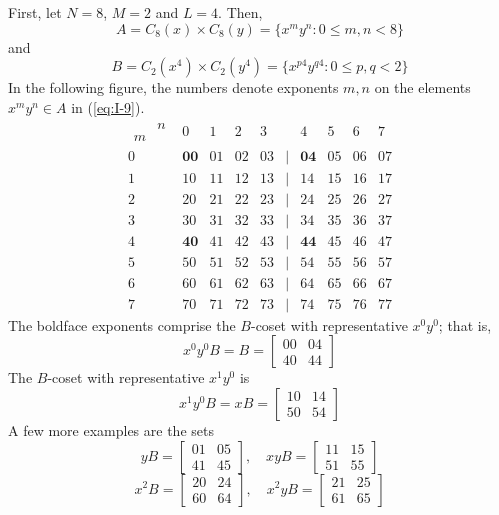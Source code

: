 \begin{example}
First, let $N=8$, $M=2$ and $L=4$.  Then,
\begin{equation}\label{eq:I-9}
A = C_8(x) \times C_8(y) = \{x^m y^n : 0 \leq m,n < 8 \}
\end{equation}
and
\[
B = C_2(x^4) \times C_2(y^4) = \{x^{p4} y^{q4} : 0 \leq p,q < 2 \}
\]
In the following figure, the numbers denote exponents $m,n$ on the
elements $x^my^n \in A$ in (\ref{eq:I-9}). 
\[
\begin{matrix}  
\begin{array}{cc} & n\\
                m & \end{array} & 0 & 1 & 2 & 3 &  & 4 & 5 & 6 & 7\\
0 & \mathbf{00} & 01 & 02 & 03 & | & \mathbf{04} & 05 & 06 & 07\\
1 & 10 & 11 & 12 & 13 & | & 14 & 15 & 16 & 17\\
2 & 20 & 21 & 22 & 23 & | & 24 & 25 & 26 & 27\\
3 & 30 & 31 & 32 & 33 & | & 34 & 35 & 36 & 37\\
\hline
4 & \mathbf{40} & 41 & 42 & 43 & | & \mathbf{44} & 45 & 46 & 47\\
5 & 50 & 51 & 52 & 53 & | & 54 & 55 & 56 & 57\\
6 & 60 & 61 & 62 & 63 & | & 64 & 65 & 66 & 67\\
7 & 70 & 71 & 72 & 73 & | & 74 & 75 & 76 & 77
\end{matrix}\]
The boldface exponents comprise the $B$-coset with representative
$x^0y^0$; that is,
\[
x^0y^0B = B = \begin{bmatrix} 00 & 04 \\ 40 & 44 \end{bmatrix}
\]
The $B$-coset with representative $x^1y^0$ is 
\[
x^1y^0B = xB = \begin{bmatrix}10 & 14 \\ 50 & 54 \end{bmatrix}
\]
A few more examples are the sets
\[
yB = \begin{bmatrix} 01 & 05 \\ 41 & 45 \end{bmatrix}, \quad
xyB = \begin{bmatrix} 11 & 15 \\ 51 & 55 \end{bmatrix}
\]
\[
x^2B = \begin{bmatrix} 20 & 24 \\ 60 & 64 \end{bmatrix}, \quad
x^2yB = \begin{bmatrix} 21 & 25 \\ 61 & 65 \end{bmatrix}
\]
\end{example}
